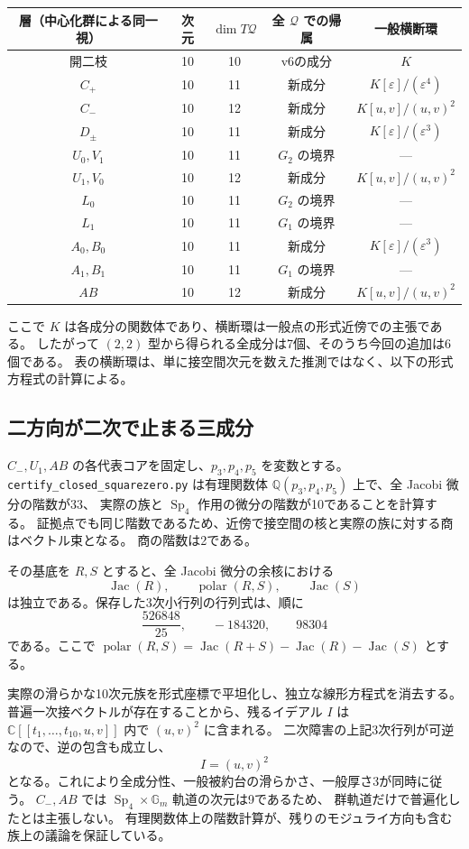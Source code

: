 \begin{center}
\begin{tabular}{c|c|c|c|c}
層（中心化群による同一視）&次元&$\dim T\mathcal Q$&全 $\mathcal Q$ での帰属&一般横断環\\\hline
開二枝&10&10&v6の成分&$K$\\
$C_+$&10&11&新成分&$K[\varepsilon]/(\varepsilon^4)$\\
$C_-$&10&12&新成分&$K[u,v]/(u,v)^2$\\
$D_\pm$&10&11&新成分&$K[\varepsilon]/(\varepsilon^3)$\\
$U_0,V_1$&10&11&$G_2$ の境界&---\\
$U_1,V_0$&10&12&新成分&$K[u,v]/(u,v)^2$\\
$L_0$&10&11&$G_2$ の境界&---\\
$L_1$&10&11&$G_1$ の境界&---\\
$A_0,B_0$&10&11&新成分&$K[\varepsilon]/(\varepsilon^3)$\\
$A_1,B_1$&10&11&$G_1$ の境界&---\\
$AB$&10&12&新成分&$K[u,v]/(u,v)^2$
\end{tabular}
\end{center}
ここで $K$ は各成分の関数体であり、横断環は一般点の形式近傍での主張である。
したがって $(2,2)$ 型から得られる全成分は7個、そのうち今回の追加は6個である。
表の横断環は、単に接空間次元を数えた推測ではなく、以下の形式方程式の計算による。

\subsection{二方向が二次で止まる三成分}

$C_-,U_1,AB$ の各代表コアを固定し、$p_3,p_4,p_5$ を変数とする。
\texttt{certify\_closed\_squarezero.py} は有理関数体
$\mathbb Q(p_3,p_4,p_5)$ 上で、全 Jacobi 微分の階数が33、
実際の族と $\operatorname{Sp}_4$ 作用の微分の階数が10であることを計算する。
証拠点でも同じ階数であるため、近傍で接空間の核と実際の族に対する商はベクトル束となる。
商の階数は2である。

その基底を $R,S$ とすると、全 Jacobi 微分の余核における
\[
 \operatorname{Jac}(R),\qquad
 \operatorname{polar}(R,S),\qquad
 \operatorname{Jac}(S)
\]
は独立である。保存した3次小行列の行列式は、順に
\[
 \frac{526848}{25},\qquad -184320,\qquad 98304
\]
である。ここで $\operatorname{polar}(R,S)=
\operatorname{Jac}(R+S)-\operatorname{Jac}(R)-\operatorname{Jac}(S)$ とする。

実際の滑らかな10次元族を形式座標で平坦化し、独立な線形方程式を消去する。
普遍一次接ベクトルが存在することから、残るイデアル $I$ は
$\mathbb C[[t_1,\ldots,t_{10},u,v]]$ 内で $(u,v)^2$ に含まれる。
二次障害の上記3次行列が可逆なので、逆の包含も成立し、
\[
 I=(u,v)^2
\]
となる。これにより全成分性、一般被約台の滑らかさ、一般厚さ3が同時に従う。
$C_-,AB$ では $\operatorname{Sp}_4\times\mathbb G_m$ 軌道の次元は9であるため、
群軌道だけで普遍化したとは主張しない。
有理関数体上の階数計算が、残りのモジュライ方向も含む族上の議論を保証している。

